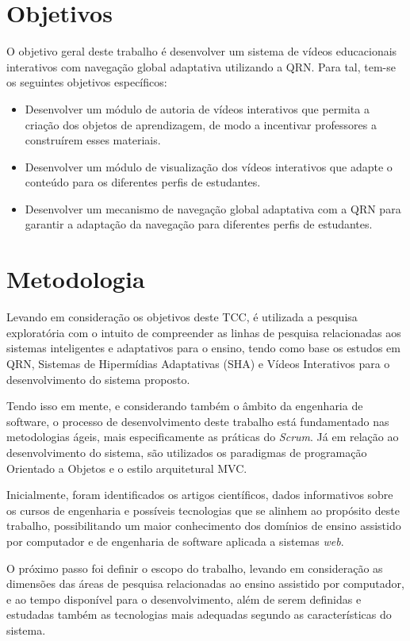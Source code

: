 \section*{Objetivos}

O objetivo geral deste trabalho é desenvolver um sistema de vídeos educacionais interativos com navegação global adaptativa utilizando a QRN. Para tal, tem-se os seguintes objetivos específicos:
\begin{itemize}
  	\item Desenvolver um módulo de autoria de vídeos interativos que permita a criação dos objetos de aprendizagem, de modo a incentivar professores a construírem esses materiais.
  	\item Desenvolver um módulo de visualização dos vídeos interativos que adapte o conteúdo para os diferentes perfis de estudantes.
  	\item Desenvolver um mecanismo de navegação global adaptativa com a QRN para garantir a adaptação da navegação para diferentes perfis de estudantes.
\end{itemize}

\section*{Metodologia}
Levando em consideração os objetivos deste TCC, é utilizada a pesquisa exploratória com o intuito de compreender as linhas de pesquisa relacionadas aos sistemas inteligentes e adaptativos para o ensino, tendo como base os estudos em QRN, Sistemas de Hipermídias Adaptativas (SHA) e Vídeos Interativos para o desenvolvimento do sistema proposto.

Tendo isso em mente, e considerando também o âmbito da engenharia de software, o processo de desenvolvimento deste trabalho está fundamentado nas metodologias ágeis, mais especificamente as práticas do \textit{Scrum}. Já em relação ao desenvolvimento do sistema, são utilizados os paradigmas de programação Orientado a Objetos e o estilo arquitetural MVC.

Inicialmente, foram identificados os artigos científicos, dados informativos sobre os cursos de engenharia e possíveis tecnologias que se alinhem ao propósito deste trabalho, possibilitando um maior conhecimento dos domínios de ensino assistido por computador e de engenharia de software aplicada a sistemas \textit{web}.

O próximo passo foi definir o escopo do trabalho, levando em consideração as dimensões das áreas de pesquisa relacionadas ao ensino assistido por computador, e ao tempo disponível para o desenvolvimento, além de serem definidas e estudadas também as tecnologias mais adequadas segundo as características do sistema.

